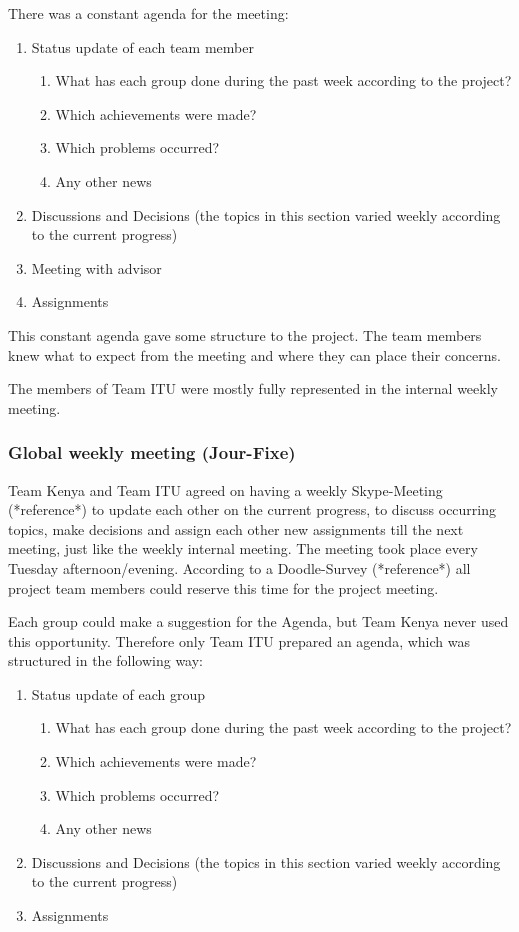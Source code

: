 There was a constant agenda for the meeting:

	\begin{enumerate}
		\item Status update of each team member
			\begin{enumerate}
				\item What has each group done during the past week according to the project?
				\item Which achievements were made?	
				\item Which problems occurred?
				\item Any other news
			\end{enumerate}
		\item Discussions and Decisions (the topics in this section varied weekly according to the current progress)
		\item Meeting with advisor	
		\item Assignments
	\end{enumerate}

This constant agenda gave some structure to the project. The team members knew what to expect from the meeting and where they can place their concerns.

The members of Team ITU were mostly fully represented in the internal weekly meeting. 

\subsubsection {Global weekly meeting (Jour-Fixe)}
Team Kenya and Team ITU agreed on having a weekly Skype-Meeting (*reference*) to update each other on the current progress, to discuss occurring topics, make decisions and assign each other new assignments till the next meeting, just like the weekly internal meeting. The meeting took place every Tuesday afternoon/evening. According to a Doodle-Survey (*reference*) all project team members could reserve this time for the project meeting.

Each group could make a suggestion for the Agenda, but Team Kenya never used this opportunity. Therefore only Team ITU prepared an agenda, which was structured in the following way:

	\begin{enumerate}
		\item Status update of each group
			\begin{enumerate}
				\item What has each group done during the past week according to the project?
				\item Which achievements were made?	
				\item Which problems occurred?
				\item Any other news
			\end{enumerate}
		\item Discussions and Decisions (the topics in this section varied weekly according to the current progress)
		\item Assignments
	\end{enumerate}

